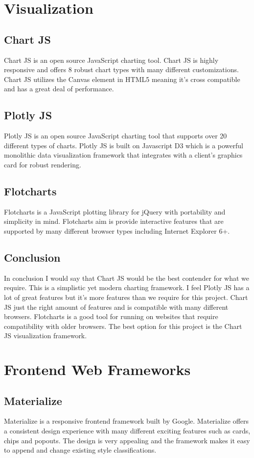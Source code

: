 \documentclass[onecolumn, draftclsnofoot,10pt, compsoc]{IEEEtran}
\begin{document}
\section{Visualization}
\subsection{Chart JS}
Chart JS is an open source JavaScript charting tool. Chart JS is highly responsive and offers 8 robust chart types with many different customizations. Chart JS utilizes the Canvas element in HTML5 meaning it’s cross compatible and has a great deal of performance.  
\subsection{Plotly JS}
Plotly JS is an open source JavaScript charting tool that supports over 20 different types of charts. Plotly JS is built on Javascript D3 which is a powerful monolithic data visualization framework that integrates with a client’s graphics card for robust rendering. 
\subsection{Flotcharts}
Flotcharts is a JavaScript plotting library for jQuery with portability and simplicity in mind.
Flotcharts aim is provide interactive features that are supported by many different browser types including Internet Explorer 6+. 
\subsection{Conclusion}
In conclusion I would say that Chart JS would be the best contender for what we require. This is  a simplistic yet modern charting framework. I feel Plotly JS has a lot of great features but it’s more features than we require for this project. Chart JS just the right amount of features and is compatible with many different browsers. Flotcharts is a good tool for running on websites that require compatibility with older browsers. The best option for this project is the Chart JS visualization framework.

\section{Frontend Web Frameworks}
\subsection{Materialize}
Materialize is a responsive frontend framework built by Google. Materialize offers a consistent design experience with many different exciting features such as cards, chips and popouts. The design is very appealing and the framework makes it easy to append and change existing style classifications. 
\end{document}

